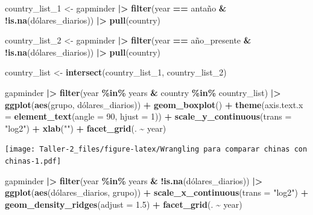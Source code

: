 \documentclass[
]{article}
\newenvironment{Shaded}{\begin{snugshade}}{\end{snugshade}}
\newcommand{\AttributeTok}[1]{\textcolor[rgb]{0.13,0.29,0.53}{#1}}
\newcommand{\DecValTok}[1]{\textcolor[rgb]{0.00,0.00,0.81}{#1}}
\newcommand{\FloatTok}[1]{\textcolor[rgb]{0.00,0.00,0.81}{#1}}
\newcommand{\FunctionTok}[1]{\textcolor[rgb]{0.13,0.29,0.53}{\textbf{#1}}}
\newcommand{\NormalTok}[1]{#1}
\newcommand{\OtherTok}[1]{\textcolor[rgb]{0.56,0.35,0.01}{#1}}
\newcommand{\SpecialCharTok}[1]{\textcolor[rgb]{0.81,0.36,0.00}{\textbf{#1}}}
\newcommand{\StringTok}[1]{\textcolor[rgb]{0.31,0.60,0.02}{#1}}
\begin{document}
\begin{Shaded}
\begin{Highlighting}[]
\NormalTok{country\_list\_1 }\OtherTok{\textless{}{-}}\NormalTok{ gapminder }\SpecialCharTok{|\textgreater{}}
  \FunctionTok{filter}\NormalTok{(year }\SpecialCharTok{==}\NormalTok{ antaño }\SpecialCharTok{\&} \SpecialCharTok{!}\FunctionTok{is.na}\NormalTok{(dólares\_diarios)) }\SpecialCharTok{|\textgreater{}}
  \FunctionTok{pull}\NormalTok{(country)}

\NormalTok{country\_list\_2 }\OtherTok{\textless{}{-}}\NormalTok{ gapminder }\SpecialCharTok{|\textgreater{}}
  \FunctionTok{filter}\NormalTok{(year }\SpecialCharTok{==}\NormalTok{ año\_presente }\SpecialCharTok{\&} \SpecialCharTok{!}\FunctionTok{is.na}\NormalTok{(dólares\_diarios)) }\SpecialCharTok{|\textgreater{}}
  \FunctionTok{pull}\NormalTok{(country)}

\NormalTok{country\_list }\OtherTok{\textless{}{-}} \FunctionTok{intersect}\NormalTok{(country\_list\_1, country\_list\_2)}

\NormalTok{gapminder }\SpecialCharTok{|\textgreater{}}
  \FunctionTok{filter}\NormalTok{(year }\SpecialCharTok{\%in\%}\NormalTok{ years }\SpecialCharTok{\&}\NormalTok{ country }\SpecialCharTok{\%in\%}\NormalTok{ country\_list) }\SpecialCharTok{|\textgreater{}}
  \FunctionTok{ggplot}\NormalTok{(}\FunctionTok{aes}\NormalTok{(grupo, dólares\_diarios)) }\SpecialCharTok{+}
  \FunctionTok{geom\_boxplot}\NormalTok{() }\SpecialCharTok{+}
  \FunctionTok{theme}\NormalTok{(}\AttributeTok{axis.text.x =} \FunctionTok{element\_text}\NormalTok{(}\AttributeTok{angle =} \DecValTok{90}\NormalTok{, }\AttributeTok{hjust =} \DecValTok{1}\NormalTok{)) }\SpecialCharTok{+}
  \FunctionTok{scale\_y\_continuous}\NormalTok{(}\AttributeTok{trans =} \StringTok{"log2"}\NormalTok{) }\SpecialCharTok{+}
  \FunctionTok{xlab}\NormalTok{(}\StringTok{""}\NormalTok{) }\SpecialCharTok{+}
  \FunctionTok{facet\_grid}\NormalTok{(. }\SpecialCharTok{\textasciitilde{}}\NormalTok{ year)}
\end{Highlighting}
\end{Shaded}

\texttt{[image: Taller-2\_files/figure-latex/Wrangling para comparar chinas con chinas-1.pdf]}

\begin{Shaded}
\begin{Highlighting}[]
\NormalTok{gapminder }\SpecialCharTok{|\textgreater{}}
  \FunctionTok{filter}\NormalTok{(year }\SpecialCharTok{\%in\%}\NormalTok{ years }\SpecialCharTok{\&} \SpecialCharTok{!}\FunctionTok{is.na}\NormalTok{(dólares\_diarios)) }\SpecialCharTok{|\textgreater{}}
  \FunctionTok{ggplot}\NormalTok{(}\FunctionTok{aes}\NormalTok{(dólares\_diarios, grupo)) }\SpecialCharTok{+}
  \FunctionTok{scale\_x\_continuous}\NormalTok{(}\AttributeTok{trans =} \StringTok{"log2"}\NormalTok{) }\SpecialCharTok{+}
  \FunctionTok{geom\_density\_ridges}\NormalTok{(}\AttributeTok{adjust =} \FloatTok{1.5}\NormalTok{) }\SpecialCharTok{+}
  \FunctionTok{facet\_grid}\NormalTok{(. }\SpecialCharTok{\textasciitilde{}}\NormalTok{ year)}
\end{Highlighting}
\end{Shaded}
\end{document}
